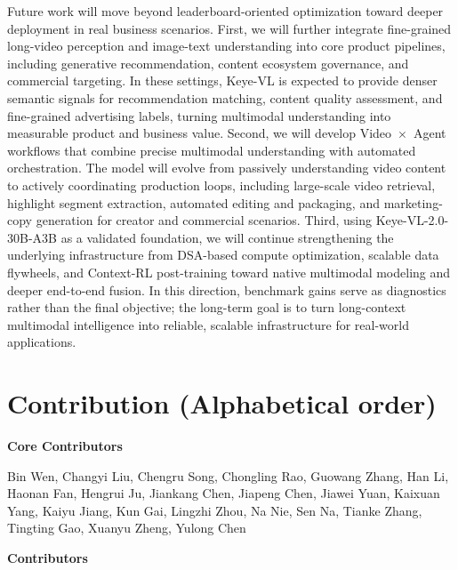 \documentclass{article} %
\begin{document}
Future work will move beyond leaderboard-oriented optimization toward deeper deployment in real business scenarios. First, we will further integrate fine-grained long-video perception and image-text understanding into core product pipelines, including generative recommendation, content ecosystem governance, and commercial targeting. In these settings, Keye-VL is expected to provide denser semantic signals for recommendation matching, content quality assessment, and fine-grained advertising labels, turning multimodal understanding into measurable product and business value. Second, we will develop Video~$\times$~Agent workflows that combine precise multimodal understanding with automated orchestration. The model will evolve from passively understanding video content to actively coordinating production loops, including large-scale video retrieval, highlight segment extraction, automated editing and packaging, and marketing-copy generation for creator and commercial scenarios. Third, using Keye-VL-2.0-30B-A3B as a validated foundation, we will continue strengthening the underlying infrastructure from DSA-based compute optimization, scalable data flywheels, and Context-RL post-training toward native multimodal modeling and deeper end-to-end fusion. In this direction, benchmark gains serve as diagnostics rather than the final objective; the long-term goal is to turn long-context multimodal intelligence into reliable, scalable infrastructure for real-world applications.



\clearpage



\clearpage
\appendix



\section{Contribution (Alphabetical order)}

\medskip
\noindent\textbf{Core Contributors}\par
\bigskip

Bin Wen, Changyi Liu, Chengru Song, Chongling Rao, Guowang Zhang,
Han Li, Haonan Fan, Hengrui Ju, Jiankang Chen, Jiapeng Chen,
Jiawei Yuan, Kaixuan Yang, Kaiyu Jiang, Kun Gai, Lingzhi Zhou,
Na Nie, Sen Na, Tianke Zhang, Tingting Gao, Xuanyu Zheng, Yulong Chen

\bigskip
\noindent\textbf{Contributors}\par
\bigskip
\end{document}
